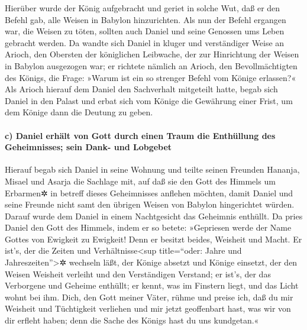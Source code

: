 Hierüber wurde der König aufgebracht und geriet in solche
Wut, daß er den Befehl gab, alle Weisen in Babylon hinzurichten.
Als nun der Befehl ergangen war, die Weisen zu töten,
sollten auch Daniel und seine Genossen ums Leben gebracht werden.
Da wandte sich Daniel in kluger und verständiger Weise an
Arioch, den Obersten der königlichen Leibwache, der zur Hinrichtung der
Weisen in Babylon ausgezogen war; er richtete nämlich an
Arioch, den Bevollmächtigten des Königs, die Frage: »Warum ist ein so
strenger Befehl vom Könige erlassen?« Als Arioch hierauf dem Daniel den
Sachverhalt mitgeteilt hatte, begab sich Daniel in den
Palast und erbat sich vom Könige die Gewährung einer Frist, um dem
Könige dann die Deutung zu geben.

\hypertarget{c-daniel-erhuxe4lt-von-gott-durch-einen-traum-die-enthuxfcllung-des-geheimnisses-sein-dank--und-lobgebet}{%
\paragraph{c) Daniel erhält von Gott durch einen Traum die Enthüllung
des Geheimnisses; sein Dank- und
Lobgebet}\label{c-daniel-erhuxe4lt-von-gott-durch-einen-traum-die-enthuxfcllung-des-geheimnisses-sein-dank--und-lobgebet}}

Hierauf begab sich Daniel in seine Wohnung und teilte
seinen Freunden Hananja, Misael und Asarja die Sachlage mit,
auf daß sie den Gott des Himmels um Erbarmen✲ in betreff
dieses Geheimnisses anflehen möchten, damit Daniel und seine Freunde
nicht samt den übrigen Weisen von Babylon hingerichtet würden.
Darauf wurde dem Daniel in einem Nachtgesicht das
Geheimnis enthüllt. Da pries Daniel den Gott des Himmels,
indem er so betete: »Gepriesen werde der Name Gottes von
Ewigkeit zu Ewigkeit! Denn er besitzt beides, Weisheit und Macht.
Er ist's, der die Zeiten und Verhältnisse\textless sup
title=``oder: Jahre und Jahreszeiten''\textgreater✲ wechseln läßt, der
Könige absetzt und Könige einsetzt, der den Weisen Weisheit verleiht und
den Verständigen Verstand; er ist's, der das Verborgene
und Geheime enthüllt; er kennt, was im Finstern liegt, und das Licht
wohnt bei ihm. Dich, den Gott meiner Väter, rühme und
preise ich, daß du mir Weisheit und Tüchtigkeit verliehen und mir jetzt
geoffenbart hast, was wir von dir erfleht haben; denn die Sache des
Königs hast du uns kundgetan.«

